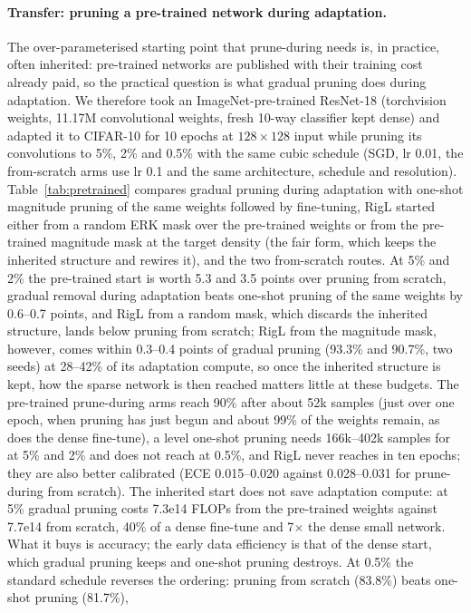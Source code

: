 \documentclass[11pt]{article}
\begin{document}
\paragraph{Transfer: pruning a pre-trained network during adaptation.} The over-parameterised starting point that
prune-during needs is, in practice, often inherited: pre-trained networks are published with their training cost already
paid, so the practical question is what gradual pruning does during adaptation.
We therefore took an ImageNet-pre-trained ResNet-18 (torchvision weights, 11.17M convolutional weights, fresh 10-way
classifier kept dense) and adapted it to CIFAR-10 for 10 epochs at $128\times128$ input while pruning its convolutions to 5\%,
2\% and 0.5\% with the same cubic schedule (SGD, lr 0.01, the from-scratch arms use lr 0.1 and the same architecture, schedule
and resolution). Table~\ref{tab:pretrained} compares gradual pruning during adaptation with one-shot magnitude pruning of the
same weights followed by fine-tuning, RigL started either from a random ERK mask over the pre-trained weights or from the
pre-trained magnitude mask at the target density (the fair form, which keeps the inherited structure and rewires it), and the
two from-scratch routes. At 5\% and 2\% the pre-trained start is worth 5.3 and 3.5 points over pruning from scratch, gradual
removal during adaptation beats one-shot pruning of the same weights by 0.6--0.7 points, and RigL from a random mask, which
discards the inherited structure, lands below pruning from scratch; RigL from the magnitude mask, however, comes within
0.3--0.4 points of gradual pruning (93.3\% and 90.7\%, two seeds) at 28--42\% of its adaptation compute, so once the
inherited structure is kept, how the sparse network is then reached matters little at these budgets. The pre-trained prune-during arms reach 90\% after about 52k
samples (just over one epoch, when pruning has just begun and about 99\% of the weights remain, as does the dense
fine-tune), a level one-shot pruning needs
166k--402k samples for at 5\% and 2\% and does not reach at 0.5\%, and RigL never reaches in ten epochs; they are also
better calibrated (ECE 0.015--0.020 against 0.028--0.031 for prune-during from scratch). The inherited start does not save
adaptation compute: at 5\% gradual pruning costs 7.3e14 FLOPs from the pre-trained weights against 7.7e14 from scratch,
40\% of a dense fine-tune and 7$\times$ the dense small network. What it buys is accuracy; the early data efficiency is
that of the dense start, which gradual pruning keeps and one-shot pruning destroys. At 0.5\% the standard schedule reverses the ordering: pruning from scratch (83.8\%) beats one-shot pruning (81.7\%),
\end{document}
